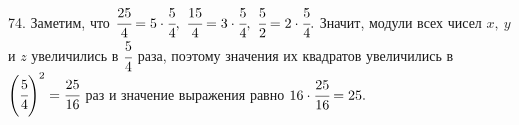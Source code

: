 74. Заметим, что $\cfrac{25}{4}=5\cdot\cfrac{5}{4},\ \cfrac{15}{4}=3\cdot\cfrac{5}{4},\ \cfrac{5}{2}=2\cdot\cfrac{5}{4}.$ Значит, модули всех чисел $x,\ y$ и $z$ увеличились в $\cfrac{5}{4}$ раза, поэтому значения их квадратов увеличились в  $\left(\cfrac{5}{4}\right)^2=\cfrac{25}{16}$ раз и значение выражения равно $16\cdot
\cfrac{25}{16}=25.$\\
